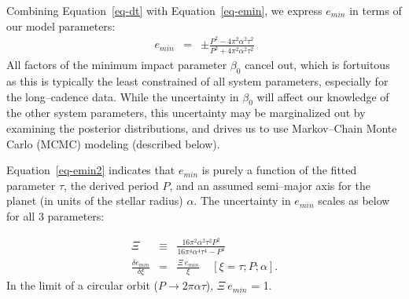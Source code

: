 Combining Equation~\ref{eq-dt} with Equation~\ref{eq-emin}, we express
$e_{min}$ in terms of our model parameters:
\begin{eqnarray}
e_{min} & = & \pm \frac{P^{2} - 4 \pi^{2} \alpha^{2} \tau^{2}}{P^{2} + 4 \pi^{2} \alpha^{2} \tau^{2}}
\label{eq-emin2}
\end{eqnarray}
All factors of the minimum impact parameter $\beta_0$ cancel out,
which is fortuitous as this is typically the least constrained of all
system parameters, especially for the long--cadence \kepler data.
While the uncertainty in $\beta_0$ will affect our knowledge of the
other system parameters, this uncertainty may be marginalized out by
examining the posterior distributions, and drives us to use
Markov--Chain Monte Carlo (MCMC) modeling (described below).

Equation~\ref{eq-emin2} indicates that $e_{min}$ is purely a function
of the fitted parameter $\tau$, the derived period $P$, and an assumed
semi--major axis for the planet (in units of the stellar radius)
$\alpha$.  The uncertainty in $e_{min}$ scales as below for all 3
parameters:

\begin{eqnarray}
\Xi & \equiv & \frac{16 \pi^{2} \alpha^{2} \tau^{2} P^{2}}{16 \pi^{4} \alpha^{4} \tau^{4} - P^{4}} \\
\frac{\delta e_{min}}{\delta \xi} & = & \frac{\Xi~e_{min}}{\xi} ~~~~~ \left[\xi = \tau; P; \alpha \right].\nonumber
\label{eq-emin3}
\end{eqnarray}
In the limit of a circular orbit ($P \rightarrow 2 \pi \alpha \tau$),
$\Xi~e_{min}$ = 1.

